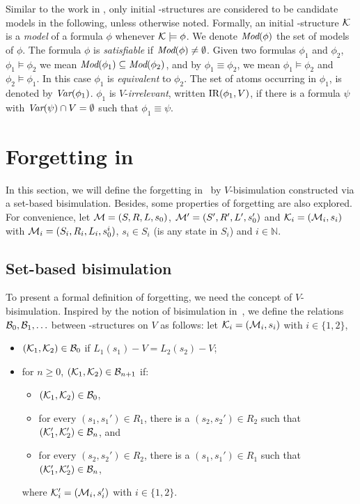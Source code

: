\documentclass[letterpaper]{article} %
\begin{document}
Similar to the work in \cite{DBLP:journals/tcs/BrowneCG88,Bolotov:1999:JETAI},
only initial \MPK-structures are considered to be candidate models
in the following, unless otherwise noted. Formally,
an initial \MPK-structure $\cal K$ is a {\em model} of a formula $\phi$
whenever ${\cal K}\models\phi$.
We denote $\textit{Mod}(\phi)$ the set of models of $\phi$.
The formula $\phi$  is {\em satisfiable}
if $\textit{Mod}(\phi)\neq\emptyset$.
Given two formulas $\phi_1$ and $\phi_2$,  $\phi_1\models\phi_2$ we mean $\textit{Mod}(\phi_1)\subseteq\textit{Mod}(\phi_2)$, and
by $\phi_1\equiv\phi_2$, we mean $\phi_1\models\phi_2$ and $\phi_2\models\phi_1$.
In this case $\phi_1$ is {\em equivalent} to $\phi_2$.
The set of atoms occurring in $\phi_1$, is denoted by $\textit{Var}(\phi_1)$.
 $\phi_1$ is $V$-{\em irrelevant}, written $\textrm{IR}(\phi_1,V)$,
if there is a formula $\psi$ with
$\textit{Var}(\psi)\cap V=\emptyset$ such that $\phi_1\equiv\psi$.






\section{Forgetting in \CTL}
In this section, we will define the forgetting in \CTL\ by $V$-bisimulation constructed via a set-based bisimulation.
Besides, some properties of forgetting are also explored.
For convenience, let ${\cal M}=(S, R, L, s_0)$, ${\cal M}'=(S',R',L',s_0')$ and ${\cal K}_i=({\cal M}_i, s_i)$ with ${\cal M}_i=(S_i, R_i,L_i, s_0^i)$, $s_i \in S_i$ (is any state in $S_i$) and $i \in \mathbb{N}$.
\subsection{Set-based bisimulation}
To present a formal definition of forgetting, we need the concept of $V$-bisimulation.
Inspired by the notion of bisimulation in~\cite{DBLP:journals/tcs/BrowneCG88}, we define the relations ${\cal B}_0,{\cal B}_1,\ldots$
between \MPK-structures on $V$ as follows: let
${\cal K}_i=({\cal M}_i,s_i)$ with $i\in\{1,2\}$,
\begin{itemize}
  \item $({\cal K}_1,{\cal K}_2)\in{\cal B}_0$ if $L_1(s_1)- V=L_2(s_2)- V$;  %
  \item for $n\ge 0$, $({\cal K}_1,{\cal K}_2)\in{\cal B}_{n+1}$ if:
  \begin{itemize}
    \item $({\cal K}_1,{\cal K}_2)\in{\cal B}_0$,
    \item for every $(s_1,s_1')\in R_1$, there is a $(s_2,s_2')\in R_2$
    such that $({\cal K}_1',{\cal K}_2')\in {\cal B}_n$, and
    \item for every $(s_2,s_2')\in R_2$, there is a $(s_1,s_1')\in R_1$
    such that $({\cal K}_1',{\cal K}_2')\in {\cal B}_n$,
  \end{itemize}
  where ${\cal K}_i'=({\cal M}_i,s_i')$ with $i\in\{1,2\}$.
\end{itemize}
\end{document}

